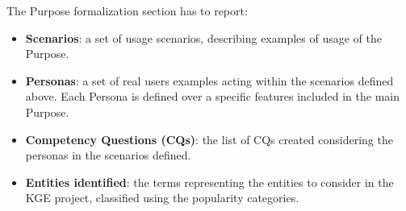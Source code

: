 
The Purpose formalization section has to report:
        \begin{itemize}
            \item \textbf{Scenarios}: a set of usage scenarios, describing examples of usage of the Purpose.
            \item \textbf{Personas}: a set of real users examples acting  within the scenarios defined above. Each Persona is defined over a specific features included in the main Purpose.
            \item \textbf{Competency Questions (CQs)}: the list of CQs created considering the personas in the scenarios defined.
            \item \textbf{Entities identified}: the terms representing the entities to consider in the KGE project, classified using the popularity categories.
        \end{itemize}